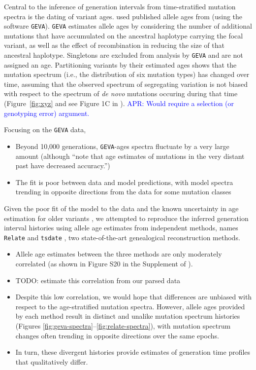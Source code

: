 \documentclass[]{article}
\newcommand{\aprcomment}[1]{{\textcolor{blue}{APR: #1}}}
\newcommand{\GEVA}{\texttt{GEVA}\xspace}
\newcommand{\tsdate}{\texttt{tsdate}\xspace}
\newcommand{\relate}{\texttt{Relate}\xspace}
\begin{document}
Central to the inference of generation intervals from time-stratified mutation
spectra is the dating of variant ages. \citet{wang2023human} used published
allele ages from \citet{albers2020dating} (using the software \GEVA).
\GEVA estimates allele ages by considering the number of additional
mutations that have accumulated on the ancestral haplotype carrying the focal
variant, as well as the effect of recombination in reducing the size of that
ancestral haplotype. Singletons are excluded from analysis by \GEVA and
are not assigned an age. Partitioning variants by their estimated ages shows
that the mutation spectrum (i.e., the distribution of six mutation types) has
changed over time, assuming that the observed spectrum of segregating variation
is not biased with respect to the spectrum of \emph{de novo} mutations occuring
during that time (Figure~\ref{fig:xyz} and see Figure 1C in
\citeauthor{wang2023human}). \aprcomment{Would require a selection (or
genotyping error) argument.}

Focusing on the \GEVA data,
\begin{itemize}
    \item Beyond 10,000 generations, \GEVA-ages spectra fluctuate by a
        very large amount (although \citet{wang2023human} ``note that age
        estimates of mutations in the very distant past have decreased
        accuracy.'')
    \item The fit is poor between data and model predictions, with model
        spectra trending in opposite directions from the data for some
        mutation classes \citep{gao2022limited}
\end{itemize}

Given the poor fit of the model to the data and the known uncertainty in age
estimation for older variants \citep{albers2020dating}, we attempted to
reproduce the inferred generation interval histories using allele age estimates
from independent methods, names \relate \citep{speidel2019method} and \tsdate
\citep{wohns2022unified}, two state-of-the-art genealogical reconstruction
methods.
\begin{itemize}
    \item Allele age estimates between the three methods are only moderately
        correlated (as shown in Figure S20 in the Supplement of
        \citet{wohns2022unified}).
    \item TODO: estimate this correlation from our parsed data
    \item Despite this low correlation, we would hope that differences are
        unbiased with respect to the age-stratified mutation spectra. However,
        allele ages provided by each method result in distinct and
        unalike mutation spectrum histories (Figures
        \ref{fig:geva-spectra}--\ref{fig:relate-spectra}), with mutation
        spectrum changes often trending in opposite directions over the same
        epochs.
    \item In turn, these divergent histories provide estimates of
        generation time profiles that qualitatively differ.
\end{itemize}
\end{document}
